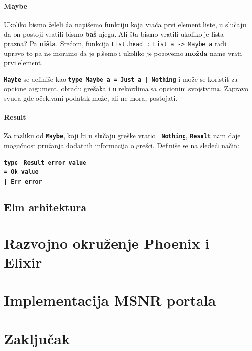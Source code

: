 \documentclass[12pt,oneside]{memoir}
\begin{document}
\subsubsection{Maybe}
Ukoliko bismo želeli da napišemo funkciju koja vraća prvi element liste, u slučaju da on
postoji vratili bismo \textbf{baš} njega. Ali šta bismo vratili ukoliko je lista prazna?
Pa \textbf{ništa}. Srećom, funkcija \texttt{List.head : List a -> Maybe a} radi upravo to
pa ne moramo da je pišemo i ukoliko je pozovemo \textbf{možda} name vrati prvi element.

\texttt{\textbf{Maybe}} se definiše kao \texttt{\textbf{type Maybe a = Just a | Nothing}}
i može se koristit za opcione argument, obradu grešaka i u rekordima sa opcionim svojstvima.
Zapravo svuda gde očekivani podatak može, ali ne mora, postojati.

\subsubsection{Result}
Za razliku od \texttt{\textbf{Maybe}}, koji bi u slučaju greške vratio \texttt{
\textbf{Nothing}}, \texttt{\textbf{Result}} nam daje mogućnost pružanja dodatnih 
informacija o grešci. Definiše se na sledeći način: \begin{tabbing}
\texttt{\textbf{type}} \= \texttt{\textbf{ Result error value}} \\
\> \=  \texttt{\textbf{= Ok value}} \\\>
\> \texttt{\textbf{| Err error }}
\end{tabbing}

\section{Elm arhitektura}

\chapter{Razvojno okruženje Phoenix i Elixir}

\chapter{Implementacija MSNR portala}

\chapter{Zaključak}


\literatura

\end{document}
